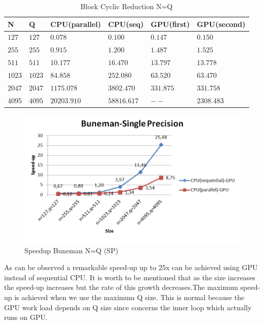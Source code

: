    \begin{table}[H]
\caption{Block Cyclic Reduction N=Q} 
\centering 
\begin{tabular}{| l |  p{1cm} |p{}| p{} |  p{}| p{} | } 
\hline\hline 
N & Q & CPU(parallel) & CPU(seq) & GPU(first)  & GPU(second) \\ [0.8ex] 
\hline
$127$ &	$127$ & $0.078$	&	$0.100$ & $0.147$ & $0.150$ \\
$255$ &	$255$ & $0.915$	&	$1.200$ & $1.487$ & $1.525$ \\
$511$ &	$511$ & $10.177$	&	$16.470$ & $13.797$ & $13.778$ \\
$1023$ &	$1023$ & $84.858$	&	$252.080$ & $63.520$ & $63.470$ \\
$2047$ &	$2047$ & $1175.078$	&	$3802.470$ & $331.875$ & $331.758$ \\
$4095$ & $4095$  & $20203.910$	&  $58816.617$ & $--$ & $2308.483$ \\[1ex]
\hline 
\end{tabular}
\label{table:bcr_n=q} 
\end{table} 

\begin{figure}[H]
   \centering
       \includegraphics[width=1\textwidth]{grafhmata/buneman_sp_speedup_nq.png}
   \caption{Speedup Buneman N=Q (SP)}
   \label{fig:Speedup Buneman N=Q (SP)}
\end{figure}

As can be observed a remarkable speed-up up to 25x can be achieved using GPU instead of sequential CPU.
It is worth to be mentioned that as the size increases the speed-up increases but the rate of this growth
decreases.The maximum speed-up is achieved when we use the maximum Q size. This is normal because the GPU work load depends on Q size since concerns the inner loop which actually runs on GPU.

